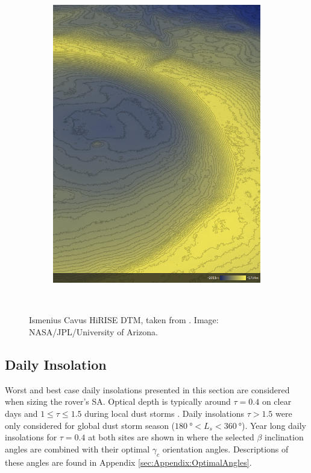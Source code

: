 \begin{figure}[h]
\begin{subfigure}[t]{\subfigureWidth}
        \includegraphics[height=\graphicsHeight]{sections/mars-solar-energy/mission-sites/images/ismenius-cavus-dtm-altimetry.png}
		\label{fig:sub:ismenius-cavus-dtm-altimetry}
	\end{subfigure}\\[0.8ex]
    \caption[Ismenius Cavus HiRISE digital terrain model]
            {Ismenius Cavus \ac{HiRISE} \ac{DTM}, taken from . Image: \ac{NASA}/\ac{JPL}/University of Arizona.}
    \label{fig:ismenius-cavus}
\vspace{-2ex}
\end{figure}

\subsection{Daily Insolation}
Worst and best case daily insolations presented in this section are considered when sizing the rover's \ac{SA}. Optical depth is typically around $\tau = 0.4$ on clear days  and $1 \leq \tau \leq 1.5$ during local dust storms . Daily insolations $\tau > 1.5$ were only considered for global dust storm season ($\SI{180}{\degree} < L_{s} < \SI{360}{\degree}$). Year long daily insolations for $\tau = 0.4$ at both sites are shown in  where the selected $\beta$ inclination angles are combined with their optimal $\gamma_c$ orientation angles. Descriptions of these angles are found in Appendix \ref{sec:Appendix:OptimalAngles}.

